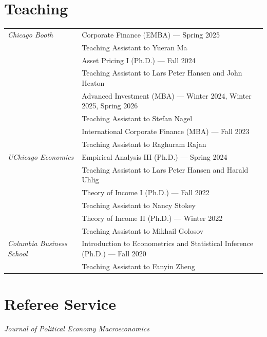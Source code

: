 \documentclass[11pt,letterpaper]{article}
\newenvironment{sectionbody}{%
  \begin{list}{}{\setlength{\leftmargin}{0.18in}\setlength{\rightmargin}{0pt}%
    \setlength{\topsep}{0pt}\setlength{\partopsep}{0pt}%
    \setlength{\parsep}{3pt}\setlength{\itemsep}{0pt}}\item[]%
}{\end{list}}
\begin{document}
\section*{Teaching}
\begin{sectionbody}
  \begin{tabularx}{\linewidth}{@{}>{\raggedright\arraybackslash}p{0.95in}X@{}}
    \textit{Chicago Booth} & Corporate Finance (EMBA) --- Spring 2025\\
      & {\small Teaching Assistant to Yueran Ma}\\[3pt]
      & Asset Pricing I (Ph.D.) --- Fall 2024\\
      & {\small Teaching Assistant to Lars Peter Hansen and John Heaton}\\[3pt]
      & Advanced Investment (MBA) --- Winter 2024, Winter 2025, Spring 2026\\
      & {\small Teaching Assistant to Stefan Nagel}\\[3pt]
      & International Corporate Finance (MBA) --- Fall 2023\\
      & {\small Teaching Assistant to Raghuram Rajan}\\[5pt]
    \textit{UChicago Economics} & Empirical Analysis III (Ph.D.) --- Spring 2024\\
      & {\small Teaching Assistant to Lars Peter Hansen and Harald Uhlig}\\[3pt]
      & Theory of Income I (Ph.D.) --- Fall 2022\\
      & {\small Teaching Assistant to Nancy Stokey}\\[3pt]
      & Theory of Income II (Ph.D.) --- Winter 2022\\
      & {\small Teaching Assistant to Mikhail Golosov}\\[5pt]
    \textit{Columbia Business School} & Introduction to Econometrics and Statistical Inference (Ph.D.) --- Fall 2020\\
      & {\small Teaching Assistant to Fanyin Zheng}
  \end{tabularx}
\end{sectionbody}

\section*{Referee Service}
\begin{sectionbody}
  \textit{Journal of Political Economy Macroeconomics}
\end{sectionbody}
\end{document}

